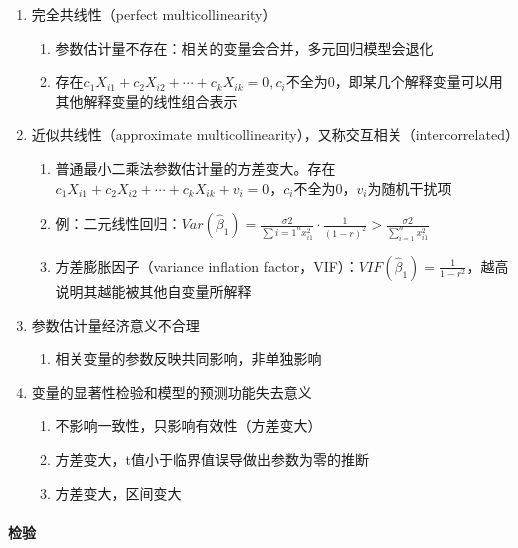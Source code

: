 \documentclass[12pt]{book}
\begin{document}
\begin{enumerate}[1.]
    \item 完全共线性（perfect multicollinearity）
          \begin{enumerate}[(1)]
              \item 参数估计量不存在：相关的变量会合并，多元回归模型会退化
              \item 存在$c_1X_{i1}+c_2X_{i2}+\cdots+c_kX_{ik}=0,c_i$不全为0，即某几个解释变量可以用其他解释变量的线性组合表示
          \end{enumerate}
    \item 近似共线性（approximate multicollinearity），又称交互相关（intercorrelated）
          \begin{enumerate}[(1)]
              \item 普通最小二乘法参数估计量的方差变大。存在$c_1X_{i1}+c_2X_{i2}+\cdots+c_kX_{ik}+v_i=0$，$c_i$不全为0，$v_i$为随机干扰项
              \item 例：二元线性回归：$Var(\hat{\beta}_{1})=\frac{σ2}{\sum{i=1}^{n}{x_{i1}^{2}}}⋅\frac{1}{(1-r)^2}>\frac{σ2}{\sum_{i=1}^{n}{x_{i1}^{2}}}$
              \item 方差膨胀因子（variance inflation factor，VIF）：$VIF\left({\hat{\beta}}_1\right)=\frac{1}{1-r^2}$，越高说明其越能被其他自变量所解释
          \end{enumerate}
    \item 参数估计量经济意义不合理
          \begin{enumerate}[(1)]
              \item 相关变量的参数反映共同影响，非单独影响
          \end{enumerate}
    \item 变量的显著性检验和模型的预测功能失去意义
          \begin{enumerate}[(1)]
              \item 不影响一致性，只影响有效性（方差变大）
              \item 方差变大，t值小于临界值误导做出参数为零的推断
              \item 方差变大，区间变大
          \end{enumerate}
\end{enumerate}


\paragraph{检验}
\end{document}
